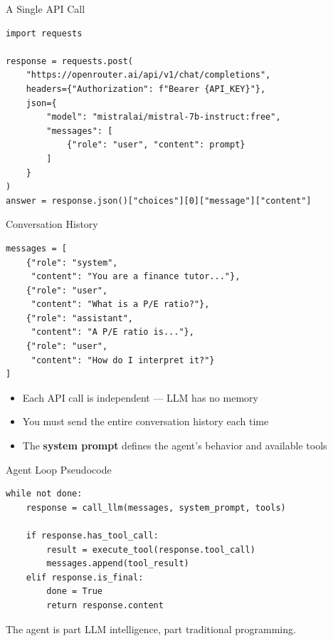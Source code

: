 \documentclass[aspectratio=169]{beamer}
\begin{document}
\begin{frame}[fragile]{A Single API Call}
\begin{shadedbox}[title=\textbf{Basic Structure}]
\begin{verbatim}
import requests

response = requests.post(
    "https://openrouter.ai/api/v1/chat/completions",
    headers={"Authorization": f"Bearer {API_KEY}"},
    json={
        "model": "mistralai/mistral-7b-instruct:free",
        "messages": [
            {"role": "user", "content": prompt}
        ]
    }
)
answer = response.json()["choices"][0]["message"]["content"]
\end{verbatim}
\end{shadedbox}
\end{frame}

\begin{frame}[fragile,shrink=5]{Conversation History}
\begin{shadedbox}[title=\textbf{Messages Are a List of Dictionaries}]
\begin{verbatim}
messages = [
    {"role": "system",
     "content": "You are a finance tutor..."},
    {"role": "user",
     "content": "What is a P/E ratio?"},
    {"role": "assistant",
     "content": "A P/E ratio is..."},
    {"role": "user",
     "content": "How do I interpret it?"}
]
\end{verbatim}
\end{shadedbox}
\vspace{0.3cm}
\begin{itemize}\small
  \item Each API call is independent --- LLM has no memory
  \item You must send the \alert{entire conversation history} each time
  \item The \textbf{system prompt} defines the agent's behavior and available tools
\end{itemize}
\end{frame}

\begin{frame}[fragile]{Agent Loop Pseudocode}
\begin{shadedbox}[title=\textbf{The Agent's Decision Loop}]
\begin{verbatim}
while not done:
    response = call_llm(messages, system_prompt, tools)

    if response.has_tool_call:
        result = execute_tool(response.tool_call)
        messages.append(tool_result)
    elif response.is_final:
        done = True
        return response.content
\end{verbatim}
\end{shadedbox}
\vspace{0.3cm}
\begin{center}
\alert{The agent is part LLM intelligence, part traditional programming.}
\end{center}
\end{frame}
\end{document}
